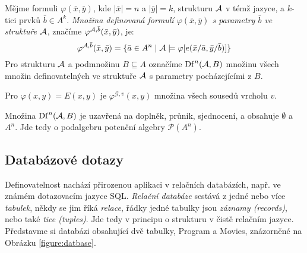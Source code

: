 \begin{definition}
    Mějme formuli $\varphi(\bar x,\bar y)$, kde $|\bar x|=n$ a $|\bar y|=k$, strukturu $\mathcal{A}$ v témž jazyce, a $k$-tici prvků $\bar b\in A^k$. \emph{Množina definovaná formulí $\varphi(\bar x,\bar y)$ s parametry $\bar b$ ve struktuře $\mathcal{A}$}, značíme $\varphi^{\mathcal{A},\bar b}(\bar x,\bar y)$, je:
    $$
    \varphi^{\mathcal{A},\bar b}(\bar x,\bar y)=\{\bar a\in A^n\mid\mathcal{A}\models\varphi[e(\bar x/\bar a,\bar y/\bar b)]\}
    $$
    Pro strukturu $\mathcal{A}$ a podmnožinu $B\subseteq A$ označíme $\mathrm{Df}^n(\mathcal{A},B)$ množinu všech množin definovatelných ve struktuře $\mathcal{A}$ s parametry pocházejícími z $B$.
\end{definition}


\begin{example}
    Pro  $\varphi(x,y)=E(x,y)$ je $\varphi^{\mathcal G,v}(x,y)$ množina všech sousedů vrcholu $v$.
\end{example}

\begin{observation}
Množina $\mathrm{Df}^n(\mathcal{A},B)$ je uzavřená na doplněk, průnik, sjednocení, a obsahuje $\emptyset$ a $A^n$. Jde tedy o podalgebru potenční algebry $\mathcal P(A^n)$.
\end{observation}

\subsection{Databázové dotazy}

Definovatelnost nachází přirozenou aplikaci v relačních databázích, např. ve známém dotazovacím jazyce SQL. \emph{Relační databáze} sestává z jedné nebo více \emph{tabulek}, někdy se jim říká \emph{relace}, řádky jedné tabulky jsou \emph{záznamy (records)}, nebo také \emph{tice (tuples)}. Jde tedy v principu o strukturu v čistě relačním jazyce. Představme si databázi obsahující dvě tabulky, Program a Movies, znázorněné na Obrázku \ref{figure:datbase}.

